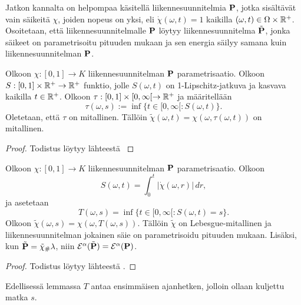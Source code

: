 Jatkon kannalta on helpompaa käsitellä liikennesuunnitelmia $\P$, jotka sisältävät vain säikeitä $\chi$, joiden nopeus on yksi, eli $\dot\chi(\omega, t) = 1$ kaikilla $(\omega, t) \in \Omega \times \Rp$. Osoitetaan, että liikennesuunnitelmalle $\P$ löytyy liikennesuunnitelma $\tilde \P$, jonka säikeet on parametrisoitu pituuden mukaan ja sen energia säilyy samana kuin liikennesuunnitelman $\P$.

\begin{lemma}
    Olkoon $\chi : [0, 1] \to K$ liikennesuunnitelman $\P$ parametrisaatio. Olkoon $S:[0,1]\times \Rp \to \Rp$ funktio, jolle $S(\omega, t)$ on 1-Lipschitz-jatkuva ja kasvava kaikilla $t \in \Rp$. Olkoon $\tau:[0, 1] \times [0, \infty [ \to \Rp$ ja määritellään
    \begin{equation*}
        \tau(\omega, s) := \inf \{t \in [0, \infty[ : S(\omega, t)\}.
    \end{equation*}
    Oletetaan, että $\tau$ on mitallinen. Tällöin $\tilde\chi(\omega, t) = \chi(\omega, \tau(\omega, t))$ on mitallinen.
\end{lemma}
\begin{proof}
    Todistus löytyy lähteestä \cite[p.44]{OptimalTransportationNetworks}
\end{proof}

\begin{lemma}\label{le:parametrizedByLength}
    Olkoon $\chi:[0,1] \to K$ liikennesuunnitelman $\P$ parametrisaatio. Olkoon 
    \begin{equation*}
        S(\omega, t) = \int_0^t|\dot\chi(\omega, r)| \, dr,
    \end{equation*}
    ja asetetaan
    \begin{equation*}
        T(\omega, s) = \inf\{t \in [0,\infty[ : S(\omega, t) = s\}.
    \end{equation*} 
    Olkoon $\tilde \chi(\omega, s) = \chi(\omega, T(\omega, s))$. Tällöin $\tilde\chi$ on Lebesgue-mitallinen ja liikennesuunnitelman jokainen säie on parametrisoidu pituuden mukaan. Lisäksi, kun $\tilde \P = \tilde \chi_\# \lambda $, niin $\E^\alpha(\tilde\P) = \E^\alpha(\P)$.
\end{lemma}

\begin{proof}
    Todistus löytyy lähteestä \cite[p.40]{OptimalTransportationNetworks}.
\end{proof}

Edellisessä lemmassa $T$ antaa ensimmäisen ajanhetken, jolloin ollaan kuljettu matka $s$.

